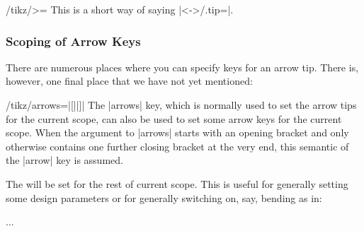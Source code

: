 \begin{key}{/tikz/>=}
    This is a short way of saying |<->/.tip=|.
\begin{codeexample}[]
\begin{tikzpicture}[scale=2,ultra thick]
  \begin{scope}[>=Latex]
    \draw[>->]    (0pt,3ex) -- (1cm,3ex);
    \draw[|<->>|] (0pt,2ex) -- (1cm,2ex);
  \end{scope}
  \begin{scope}[>=Stealth]
    \draw[>->]    (0pt,1ex) -- (1cm,1ex);
    \draw[|<<.<->|] (0pt,0ex) -- (1cm,0ex);
  \end{scope}
\end{tikzpicture}
\end{codeexample}
\end{key}


\subsubsection{Scoping of Arrow Keys}
\label{section-arrow-scopes}

There are numerous places where you can specify keys for an arrow tip. There
is, however, one final place that we have not yet mentioned:

\begin{key}{/tikz/arrows=|[||]|}
    The |arrows| key, which is normally used to set the arrow tips for the
    current scope, can also be used to set some arrow keys for the current
    scope. When the argument to |arrows| starts with an opening bracket and
    only otherwise contains one further closing bracket at the very end, this
    semantic of the |arrow| key is assumed.

    The  will be set for the rest of current scope. This is
    useful for generally setting some design parameters or for generally
    switching on, say, bending as in:
\begin{codeexample}
\tikz [arrows={[bend]}] ... %
\end{codeexample}
\end{key}

